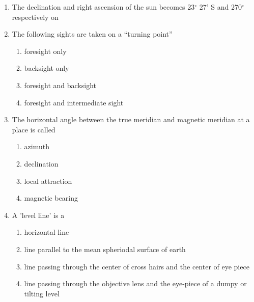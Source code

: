 \documentclass[11pt,a4paper]{article}
\begin{document}
\begin{enumerate}
{}
\\
\item{The declination and right ascension of the sun becomes 23$^\circ$ 27' S and 270$^\circ$ respectively on
}
\\
\item{The following sights are taken on a ``turning point''
}
\begin{enumerate}[label=\Alph*.]
\item{foresight only}
\item{backsight only}
\item{foresight and backsight}
\item{foresight and intermediate sight}
\end{enumerate}
\item{The horizontal angle between the true meridian and magnetic meridian at a place is called}
\begin{enumerate}[label=\Alph*.]
\item{azimuth}
\item{declination}
\item{local attraction}
\item{magnetic bearing}
\end{enumerate}
\item{A 'level line' is a
}
\begin{enumerate}[label=\Alph*.]
\item{horizontal line}
\item{line parallel to the mean spheriodal surface of earth}
\item{line passing through the center of cross hairs and the center of eye piece}
\item{line passing through the objective lens and the eye-piece of a dumpy or tilting level}
\end{enumerate}

\end{enumerate}
\end{document}
